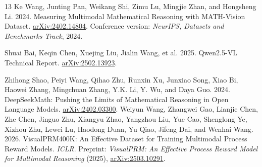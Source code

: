 \documentclass[11pt,letterpaper]{article}
\newcommand{\arxiv}[1]{\href{https://arxiv.org/abs/#1}{arXiv:#1}}
\begin{document}
\begin{thebibliography}{13}
 Ke Wang, Junting Pan, Weikang Shi, Zimu Lu, Mingjie Zhan, and Hongsheng Li. 2024. Measuring Multimodal Mathematical Reasoning with MATH-Vision Dataset. \arxiv{2402.14804}. Conference version: \emph{NeurIPS, Datasets and Benchmarks Track}, 2024.
{\raggedright{} Shuai Bai, Keqin Chen, Xuejing Liu, Jialin Wang, et al. 2025. Qwen2.5-VL Technical Report. \arxiv{2502.13923}.\par}
 Zhihong Shao, Peiyi Wang, Qihao Zhu, Runxin Xu, Junxiao Song, Xiao Bi, Haowei Zhang, Mingchuan Zhang, Y.K. Li, Y. Wu, and Daya Guo. 2024. DeepSeekMath: Pushing the Limits of Mathematical Reasoning in Open Language Models. \arxiv{2402.03300}.
 Weiyun Wang, Zhangwei Gao, Lianjie Chen, Zhe Chen, Jinguo Zhu, Xiangyu Zhao, Yangzhou Liu, Yue Cao, Shenglong Ye, Xizhou Zhu, Lewei Lu, Haodong Duan, Yu Qiao, Jifeng Dai, and Wenhai Wang. 2026. VisualPRM400K: An Effective Dataset for Training Multimodal Process Reward Models. \emph{ICLR}. Preprint: \emph{VisualPRM: An Effective Process Reward Model for Multimodal Reasoning} (2025), \arxiv{2503.10291}.
\end{thebibliography}
\end{document}
